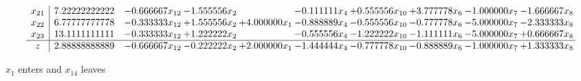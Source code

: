 \documentclass[10pt]{article}
\begin{document}
\[\begin{array}{c| c c@{\hskip 2pt} c@{\hskip 2pt} c@{\hskip 2pt} c@{\hskip 2pt} c@{\hskip 2pt} c@{\hskip 2pt} c@{\hskip 2pt} c@{\hskip 2pt} }
 x_{21}   &  7.22222222222 & -0.666667 x_{12} & -1.555556 x_{2} &   & -0.111111 x_{4} & + 0.555556 x_{10} & + 3.777778 x_{6} & -1.000000 x_{7} & -1.666667 x_{8}\\
 x_{22}   &  6.77777777778 & -0.333333 x_{12} & + 1.555556 x_{2} & + 4.000000 x_{1} & -0.888889 x_{4} & -0.555556 x_{10} & -0.777778 x_{6} & -5.000000 x_{7} & -2.333333 x_{8}\\
 x_{23}   &  13.1111111111 & -0.333333 x_{12} & + 1.222222 x_{2} &   & -0.555556 x_{4} & -1.222222 x_{10} & -1.111111 x_{6} & -5.000000 x_{7} & + 0.666667 x_{8}\\
\hline
z    &  2.88888888889 & -0.666667 x_{12} & -0.222222 x_{2} & + 2.000000 x_{1} & -1.444444 x_{4} & -0.777778 x_{10} & -0.888889 x_{6} & -1.000000 x_{7} & + 1.333333 x_{8}\\
\end{array}\]


 $ x_{1} $ enters and $ x_{14} $ leaves 
\end{document}

